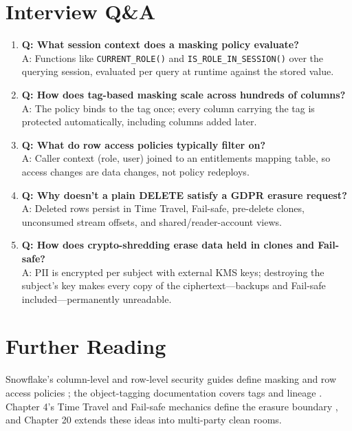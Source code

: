 \section{Interview Q\&A}
\begin{enumerate}
    \item \textbf{Q: What session context does a masking policy evaluate?}\\
    A: Functions like \texttt{CURRENT\_ROLE()} and \texttt{IS\_ROLE\_IN\_SESSION()} over the querying session, evaluated per query at runtime against the stored value.
    \item \textbf{Q: How does tag-based masking scale across hundreds of columns?}\\
    A: The policy binds to the tag once; every column carrying the tag is protected automatically, including columns added later.
    \item \textbf{Q: What do row access policies typically filter on?}\\
    A: Caller context (role, user) joined to an entitlements mapping table, so access changes are data changes, not policy redeploys.
    \item \textbf{Q: Why doesn't a plain DELETE satisfy a GDPR erasure request?}\\
    A: Deleted rows persist in Time Travel, Fail-safe, pre-delete clones, unconsumed stream offsets, and shared/reader-account views.
    \item \textbf{Q: How does crypto-shredding erase data held in clones and Fail-safe?}\\
    A: PII is encrypted per subject with external KMS keys; destroying the subject's key makes every copy of the ciphertext---backups and Fail-safe included---permanently unreadable.
\end{enumerate}

\section{Further Reading}
Snowflake's column-level and row-level security guides define masking and row access policies \cite{snowflakeMaskingDocs,snowflakeRowAccessDocs}; the object-tagging documentation covers tags and lineage \cite{snowflakeTaggingDocs}. Chapter 4's Time Travel and Fail-safe mechanics define the erasure boundary \cite{snowflakeTimeTravelDocs,snowflakeFailSafeDocs}, and Chapter 20 extends these ideas into multi-party clean rooms.

